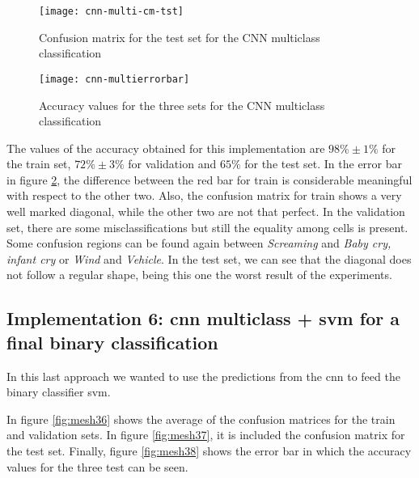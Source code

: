 	\begin{figure}[H]
		\centering
		\captionsetup{justification=centering}
		\texttt{[image: cnn-multi-cm-tst]}
		\caption{Confusion matrix for the test set for the CNN multiclass classification}
		\label{fig:mesh34}
	\end{figure}
	
	\begin{figure}[H]
		\centering
		\captionsetup{justification=centering}
		\texttt{[image: cnn-multierrorbar]}
		\caption{Accuracy values for the three sets for the CNN multiclass classification}
		\label{fig:mesh35}
	\end{figure}

	The values of the accuracy obtained for this implementation are $98\% \pm 1\%$ for the train set, $72\% \pm 3\%$ for validation and $65\%$ for the test set. In the error bar in figure \ref{fig:mesh35}, the difference between the red bar for train is considerable meaningful with respect to the other two. Also, the confusion matrix for train shows a very well marked diagonal, while the other two are not that perfect. In the validation set, there are some misclassifications but still the equality among cells is present. Some confusion regions can be found again between \textit{Screaming} and \textit{Baby cry, infant cry} or \textit{Wind} and \textit{Vehicle}. In the test set, we can see that the diagonal does not follow a regular shape, being this one the worst result of the experiments.

\subsection{Implementation 6: \acrshort{cnn} multiclass + \acrshort{svm} for a final binary classification}

	In this last approach we wanted to use the predictions from the \acrshort{cnn} to feed the binary classifier \acrshort{svm}.
	
	In figure \ref{fig:mesh36} shows the average of the confusion matrices for the train and validation sets. In figure \ref{fig:mesh37}, it is included the confusion matrix for the test set. Finally, figure \ref{fig:mesh38} shows the error bar in which the accuracy values for the three test can be seen.
	
